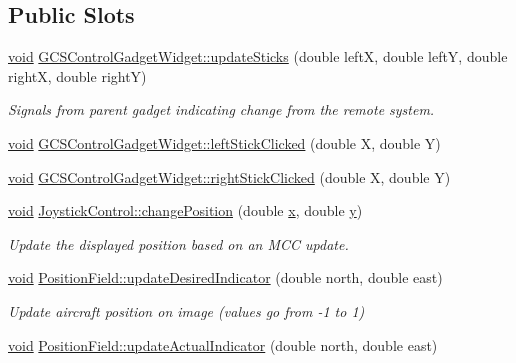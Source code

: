 \subsection*{\-Public \-Slots}
\begin{DoxyCompactItemize}
\item 
\hyperlink{group___u_a_v_objects_plugin_ga444cf2ff3f0ecbe028adce838d373f5c}{void} \hyperlink{group___g_c_s_control_gadget_plugin_ga279299922ac5990f798325ad238ae58a}{\-G\-C\-S\-Control\-Gadget\-Widget\-::update\-Sticks} (double left\-X, double left\-Y, double right\-X, double right\-Y)
\begin{DoxyCompactList}\small\item\em \-Signals from parent gadget indicating change from the remote system. \end{DoxyCompactList}\item 
\hyperlink{group___u_a_v_objects_plugin_ga444cf2ff3f0ecbe028adce838d373f5c}{void} \hyperlink{group___g_c_s_control_gadget_plugin_ga04d9e7c1a62eff3012500caccbde66d8}{\-G\-C\-S\-Control\-Gadget\-Widget\-::left\-Stick\-Clicked} (double \-X, double \-Y)
\item 
\hyperlink{group___u_a_v_objects_plugin_ga444cf2ff3f0ecbe028adce838d373f5c}{void} \hyperlink{group___g_c_s_control_gadget_plugin_gab69d624dde0231e33d3a5bb6d4d769fa}{\-G\-C\-S\-Control\-Gadget\-Widget\-::right\-Stick\-Clicked} (double \-X, double \-Y)
\item 
\hyperlink{group___u_a_v_objects_plugin_ga444cf2ff3f0ecbe028adce838d373f5c}{void} \hyperlink{group___g_c_s_control_gadget_plugin_ga38032aee1ab31edefa56c0274624604c}{\-Joystick\-Control\-::change\-Position} (double \hyperlink{_o_p_plots_8m_a9336ebf25087d91c818ee6e9ec29f8c1}{x}, double \hyperlink{_o_p_plots_8m_a2fb1c5cf58867b5bbc9a1b145a86f3a0}{y})
\begin{DoxyCompactList}\small\item\em \-Update the displayed position based on an \-M\-C\-C update. \end{DoxyCompactList}\item 
\hyperlink{group___u_a_v_objects_plugin_ga444cf2ff3f0ecbe028adce838d373f5c}{void} \hyperlink{group___g_c_s_control_gadget_plugin_gaf3402b55a7601e5b8b3346b40b0f0df7}{\-Position\-Field\-::update\-Desired\-Indicator} (double north, double east)
\begin{DoxyCompactList}\small\item\em \-Update aircraft position on image (values go from -\/1 to 1) \end{DoxyCompactList}\item 
\hyperlink{group___u_a_v_objects_plugin_ga444cf2ff3f0ecbe028adce838d373f5c}{void} \hyperlink{group___g_c_s_control_gadget_plugin_ga1945f29d366d975855609e7a8e8a1338}{\-Position\-Field\-::update\-Actual\-Indicator} (double north, double east)
\end{DoxyCompactItemize}
